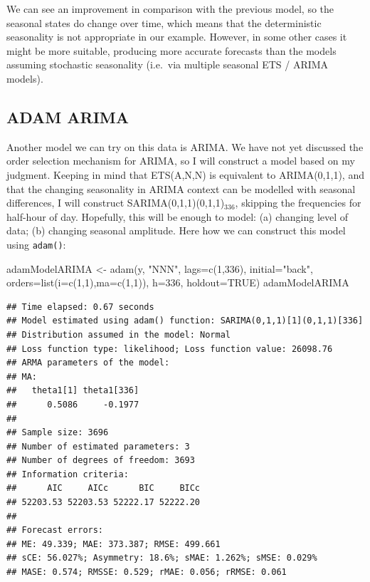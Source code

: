 \documentclass[
]{book}
\newenvironment{Shaded}{\begin{snugshade}}{\end{snugshade}}
\newcommand{\AttributeTok}[1]{\textcolor[rgb]{0.77,0.63,0.00}{#1}}
\newcommand{\ConstantTok}[1]{\textcolor[rgb]{0.00,0.00,0.00}{#1}}
\newcommand{\DecValTok}[1]{\textcolor[rgb]{0.00,0.00,0.81}{#1}}
\newcommand{\FunctionTok}[1]{\textcolor[rgb]{0.00,0.00,0.00}{#1}}
\newcommand{\NormalTok}[1]{#1}
\newcommand{\OtherTok}[1]{\textcolor[rgb]{0.56,0.35,0.01}{#1}}
\newcommand{\StringTok}[1]{\textcolor[rgb]{0.31,0.60,0.02}{#1}}
\theoremstyle{definition}
\theoremstyle{definition}
\theoremstyle{definition}
\theoremstyle{definition}
\theoremstyle{remark}
\begin{document}
We can see an improvement in comparison with the previous model, so the seasonal states do change over time, which means that the deterministic seasonality is not appropriate in our example. However, in some other cases it might be more suitable, producing more accurate forecasts than the models assuming stochastic seasonality (i.e.~via multiple seasonal ETS / ARIMA models).

\hypertarget{adam-arima}{%
\subsection{ADAM ARIMA}\label{adam-arima}}

Another model we can try on this data is ARIMA. We have not yet discussed the order selection mechanism for ARIMA, so I will construct a model based on my judgment. Keeping in mind that ETS(A,N,N) is equivalent to ARIMA(0,1,1), and that the changing seasonality in ARIMA context can be modelled with seasonal differences, I will construct SARIMA(0,1,1)(0,1,1)\(_{336}\), skipping the frequencies for half-hour of day. Hopefully, this will be enough to model: (a) changing level of data; (b) changing seasonal amplitude. Here how we can construct this model using \texttt{adam()}:

\begin{Shaded}
\begin{Highlighting}[]
\NormalTok{adamModelARIMA }\OtherTok{\textless{}{-}} \FunctionTok{adam}\NormalTok{(y, }\StringTok{"NNN"}\NormalTok{, }\AttributeTok{lags=}\FunctionTok{c}\NormalTok{(}\DecValTok{1}\NormalTok{,}\DecValTok{336}\NormalTok{), }\AttributeTok{initial=}\StringTok{"back"}\NormalTok{,}
                       \AttributeTok{orders=}\FunctionTok{list}\NormalTok{(}\AttributeTok{i=}\FunctionTok{c}\NormalTok{(}\DecValTok{1}\NormalTok{,}\DecValTok{1}\NormalTok{),}\AttributeTok{ma=}\FunctionTok{c}\NormalTok{(}\DecValTok{1}\NormalTok{,}\DecValTok{1}\NormalTok{)),}
                       \AttributeTok{h=}\DecValTok{336}\NormalTok{, }\AttributeTok{holdout=}\ConstantTok{TRUE}\NormalTok{)}
\NormalTok{adamModelARIMA}
\end{Highlighting}
\end{Shaded}

\begin{verbatim}
## Time elapsed: 0.67 seconds
## Model estimated using adam() function: SARIMA(0,1,1)[1](0,1,1)[336]
## Distribution assumed in the model: Normal
## Loss function type: likelihood; Loss function value: 26098.76
## ARMA parameters of the model:
## MA:
##   theta1[1] theta1[336] 
##      0.5086     -0.1977 
## 
## Sample size: 3696
## Number of estimated parameters: 3
## Number of degrees of freedom: 3693
## Information criteria:
##      AIC     AICc      BIC     BICc 
## 52203.53 52203.53 52222.17 52222.20 
## 
## Forecast errors:
## ME: 49.339; MAE: 373.387; RMSE: 499.661
## sCE: 56.027%; Asymmetry: 18.6%; sMAE: 1.262%; sMSE: 0.029%
## MASE: 0.574; RMSSE: 0.529; rMAE: 0.056; rRMSE: 0.061
\end{verbatim}
\end{document}
